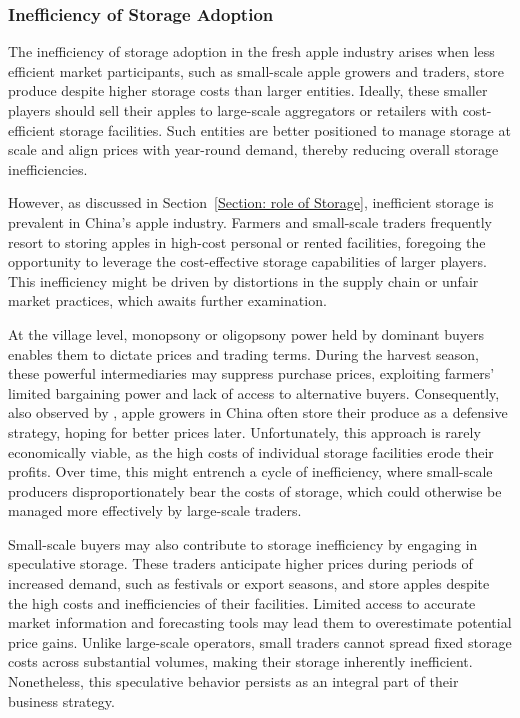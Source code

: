 \subsubsection{Inefficiency of Storage Adoption}
\noindent The inefficiency of storage adoption in the fresh apple industry arises when less efficient market participants, such as small-scale apple growers and traders, store produce despite higher storage costs than larger entities. Ideally, these smaller players should sell their apples to large-scale aggregators or retailers with cost-efficient storage facilities. Such entities are better positioned to manage storage at scale and align prices with year-round demand, thereby reducing overall storage inefficiencies.

However, as discussed in Section~\ref{Section: role of Storage}, inefficient storage is prevalent in China's apple industry. Farmers and small-scale traders frequently resort to storing apples in high-cost personal or rented facilities, foregoing the opportunity to leverage the cost-effective storage capabilities of larger players. This inefficiency might be driven by distortions in the supply chain or unfair market practices, which awaits further examination.

At the village level, monopsony or oligopsony power held by dominant buyers enables them to dictate prices and trading terms. During the harvest season, these powerful intermediaries may suppress purchase prices, exploiting farmers' limited bargaining power and lack of access to alternative buyers. Consequently, also observed by \cite{jin2024losses}, apple growers in China often store their produce as a defensive strategy, hoping for better prices later. Unfortunately, this approach is rarely economically viable, as the high costs of individual storage facilities erode their profits. Over time, this might entrench a cycle of inefficiency, where small-scale producers disproportionately bear the costs of storage, which could otherwise be managed more effectively by large-scale traders.

Small-scale buyers may also contribute to storage inefficiency by engaging in speculative storage. These traders anticipate higher prices during periods of increased demand, such as festivals or export seasons, and store apples despite the high costs and inefficiencies of their facilities. Limited access to accurate market information and forecasting tools may lead them to overestimate potential price gains. Unlike large-scale operators, small traders cannot spread fixed storage costs across substantial volumes, making their storage inherently inefficient. Nonetheless, this speculative behavior persists as an integral part of their business strategy.

